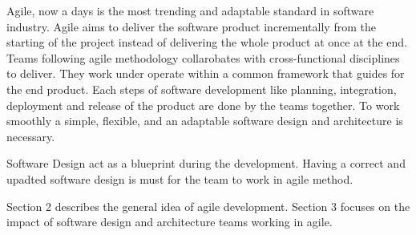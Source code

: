 Agile, now a days is the most trending and adaptable standard in software industry. Agile aims to deliver the software product incrementally from the starting of the project instead of delivering the whole product at once at the end. Teams following agile methodology collarobates with cross-functional disciplines to deliver. They work under operate within a common framework that guides for the end product. Each steps of software development like planning, integration, deployment and release of the product are done by the teams together. To work smoothly a simple, flexible, and an adaptable software design and architecture is necessary.

Software Design act as a blueprint during the development. Having a correct and upadted software design is must for the team to work in agile method.

Section 2 describes the general idea of agile development. Section 3 focuses on the impact of software design and architecture teams working in agile.
